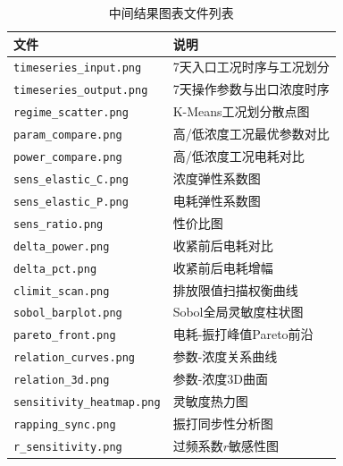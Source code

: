 \begin{table}[H]
  \centering
  \caption{中间结果图表文件列表}
  \label{tab:appendix_outputs}
  \renewcommand{\arraystretch}{1.05}
  \scriptsize
  \begin{tabularx}{\textwidth}{lX}
    \toprule
    文件 & 说明 \\
    \midrule
    \texttt{timeseries\_input.png} & 7天入口工况时序与工况划分 \\
    \texttt{timeseries\_output.png} & 7天操作参数与出口浓度时序 \\
    \texttt{regime\_scatter.png} & K-Means工况划分散点图 \\
    \texttt{param\_compare.png} & 高/低浓度工况最优参数对比 \\
    \texttt{power\_compare.png} & 高/低浓度工况电耗对比 \\
    \texttt{sens\_elastic\_C.png} & 浓度弹性系数图 \\
    \texttt{sens\_elastic\_P.png} & 电耗弹性系数图 \\
    \texttt{sens\_ratio.png} & 性价比图 \\
    \texttt{delta\_power.png} & 收紧前后电耗对比 \\
    \texttt{delta\_pct.png} & 收紧前后电耗增幅 \\
    \texttt{climit\_scan.png} & 排放限值扫描权衡曲线 \\
    \texttt{sobol\_barplot.png} & Sobol全局灵敏度柱状图 \\
    \texttt{pareto\_front.png} & 电耗-振打峰值Pareto前沿 \\
    \texttt{relation\_curves.png} & 参数-浓度关系曲线 \\
    \texttt{relation\_3d.png} & 参数-浓度3D曲面 \\
    \texttt{sensitivity\_heatmap.png} & 灵敏度热力图 \\
    \texttt{rapping\_sync.png} & 振打同步性分析图 \\
    \texttt{r\_sensitivity.png} & 过频系数$r$敏感性图 \\
    \bottomrule
  \end{tabularx}
\end{table}

